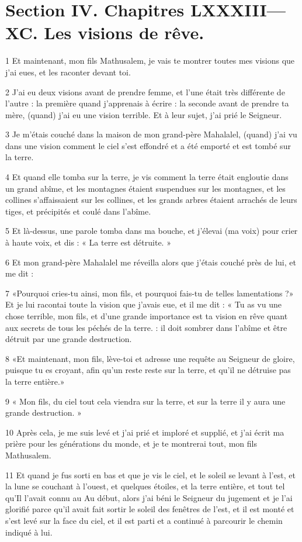 \part {Section IV. Chapitres LXXXIII—XC. Les visions de rêve.}


\par 1 Et maintenant, mon fils Mathusalem, je vais te montrer toutes mes visions que j'ai eues, et les raconter devant toi.
\par 2 J'ai eu deux visions avant de prendre femme, et l'une était très différente de l'autre : la première quand j'apprenais à écrire : la seconde avant de prendre ta mère, (quand) j'ai eu une vision terrible. Et à leur sujet, j'ai prié le Seigneur.
\par 3 Je m'étais couché dans la maison de mon grand-père Mahalalel, (quand) j'ai vu dans une vision comment le ciel s'est effondré et a été emporté et est tombé sur la terre.
\par 4 Et quand elle tomba sur la terre, je vis comment la terre était engloutie dans un grand abîme, et les montagnes étaient suspendues sur les montagnes, et les collines s'affaissaient sur les collines, et les grands arbres étaient arrachés de leurs tiges, et précipités et coulé dans l'abîme.
\par 5 Et là-dessus, une parole tomba dans ma bouche, et j'élevai (ma voix) pour crier à haute voix, et dis : « La terre est détruite. »
\par 6 Et mon grand-père Mahalalel me réveilla alors que j'étais couché près de lui, et me dit :
\par 7 «Pourquoi cries-tu ainsi, mon fils, et pourquoi fais-tu de telles lamentations ?» Et je lui racontai toute la vision que j'avais eue, et il me dit : « Tu as vu une chose terrible, mon fils, et d'une grande importance est ta vision en rêve quant aux secrets de tous les péchés de la terre. : il doit sombrer dans l’abîme et être détruit par une grande destruction.
\par 8 «Et maintenant, mon fils, lève-toi et adresse une requête au Seigneur de gloire, puisque tu es croyant, afin qu'un reste reste sur la terre, et qu'il ne détruise pas la terre entière.»
\par 9 « Mon fils, du ciel tout cela viendra sur la terre, et sur la terre il y aura une grande destruction. »
\par 10 Après cela, je me suis levé et j'ai prié et imploré et supplié, et j'ai écrit ma prière pour les générations du monde, et je te montrerai tout, mon fils Mathusalem.
\par 11 Et quand je fus sorti en bas et que je vis le ciel, et le soleil se levant à l'est, et la lune se couchant à l'ouest, et quelques étoiles, et la terre entière, et tout tel qu'Il l'avait connu au Au début, alors j'ai béni le Seigneur du jugement et je l'ai glorifié parce qu'il avait fait sortir le soleil des fenêtres de l'est, et il est monté et s'est levé sur la face du ciel, et il est parti et a continué à parcourir le chemin indiqué à lui.

